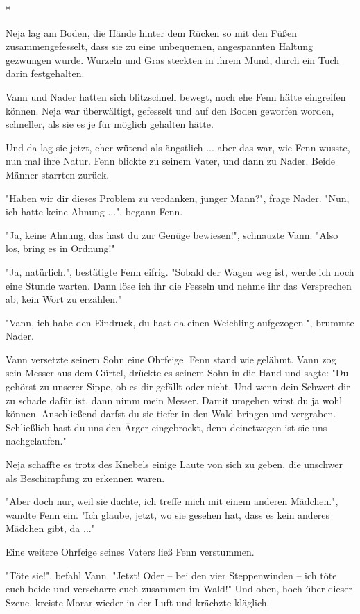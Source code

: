 \documentclass[10pt, a4paper, oneside]{book}
\begin{document}
\begin{multicols}{2}
\begin{center}
    *
\end{center}

Neja lag am Boden, die Hände hinter dem Rücken so mit den Füßen zusammengefesselt, dass sie zu eine unbequemen, angespannten Haltung gezwungen wurde. Wurzeln und Gras steckten in ihrem Mund, durch ein Tuch darin festgehalten.

Vann und Nader hatten sich blitzschnell bewegt, noch ehe Fenn hätte eingreifen können. Neja war überwältigt, gefesselt und auf den Boden geworfen worden, schneller, als sie es je für möglich gehalten hätte.

Und da lag sie jetzt, eher wütend als ängstlich ... aber das war, wie Fenn wusste, nun mal ihre Natur. Fenn blickte zu seinem Vater, und dann zu Nader. Beide Männer starrten zurück.

"Haben wir dir dieses Problem zu verdanken, junger Mann?", frage Nader. "Nun, ich hatte keine Ahnung ...", begann Fenn.

"Ja, keine Ahnung, das hast du zur Genüge bewiesen!", schnauzte Vann. "Also los, bring es in Ordnung!"

"Ja, natürlich.", bestätigte Fenn eifrig. "Sobald der Wagen weg ist, werde ich noch eine Stunde warten. Dann löse ich ihr die Fesseln und nehme ihr das Versprechen ab, kein Wort zu erzählen."

"Vann, ich habe den Eindruck, du hast da einen Weichling aufgezogen.", brummte Nader.

Vann versetzte seinem Sohn eine Ohrfeige. Fenn stand wie gelähmt. Vann zog sein Messer aus dem Gürtel, drückte es seinem Sohn in die Hand und sagte: "Du gehörst zu unserer Sippe, ob es dir gefällt oder nicht. Und wenn dein Schwert dir zu schade dafür ist, dann nimm mein Messer. Damit umgehen wirst du ja wohl können. Anschließend darfst du sie tiefer in den Wald bringen und vergraben. Schließlich hast du uns den Ärger eingebrockt, denn deinetwegen ist sie uns nachgelaufen."

Neja schaffte es trotz des Knebels einige Laute von sich zu geben, die unschwer als Beschimpfung zu erkennen waren.

"Aber doch nur, weil sie dachte, ich treffe mich mit einem anderen Mädchen.", wandte Fenn ein. "Ich glaube, jetzt, wo sie gesehen hat, dass es kein anderes Mädchen gibt, da ..."

Eine weitere Ohrfeige seines Vaters ließ Fenn verstummen.

"Töte sie!", befahl Vann. "Jetzt! Oder – bei den vier Steppenwinden – ich töte euch beide und verscharre euch zusammen im Wald!" 
Und oben, hoch über dieser Szene, kreiste Morar wieder in der Luft und krächzte kläglich. 


\end{multicols}
\end{document}
